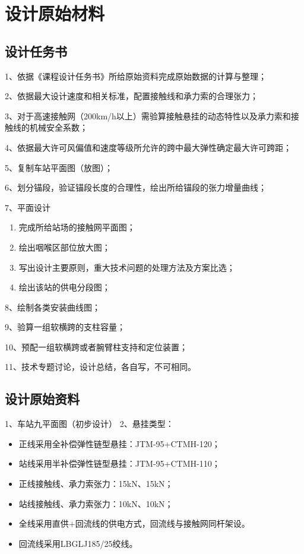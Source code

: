 \chapter{设计原始材料}


\section{设计任务书}
1、依据《课程设计任务书》所给原始资料完成原始数据的计算与整理；

2、依据最大设计速度和相关标准，配置接触线和承力索的合理张力；

3、对于高速接触网（200km/h以上）需验算接触悬挂的动态特性以及承力索和接触线的机械安全系数；

4、依据最大许可风偏值和速度等级所允许的跨中最大弹性确定最大许可跨距；

5、复制车站平面图（放图）；

6、划分锚段，验证锚段长度的合理性，绘出所给锚段的张力增量曲线；

7、平面设计
\begin{enumerate}
	\item 完成所给站场的接触网平面图；
	\item 绘出咽喉区部位放大图；
	\item 写出设计主要原则，重大技术问题的处理方法及方案比选；
	\item 绘出该站的供电分段图；
\end{enumerate}

8、绘制各类安装曲线图；

9、验算一组软横跨的支柱容量；

10、预配一组软横跨或者腕臂柱支持和定位装置；

11、技术专题讨论，设计总结，各自写，不可相同。

\section{设计原始资料}
1、车站九平面图（初步设计）
2、悬挂类型： 
\begin{itemize}
	\item 正线采用全补偿弹性链型悬挂：JTM-95+CTMH-120；
	\item 站线采用半补偿弹性链型悬挂：JTM-95+CTMH-110；
	\item 正线接触线、承力索张力：15kN、15kN；
	\item 站线接触线、承力索张力：10kN、10kN；
	\item 全线采用直供+回流线的供电方式，回流线与接触网同杆架设。
	\item 回流线采用LBGLJ185/25绞线。
\end{itemize}

